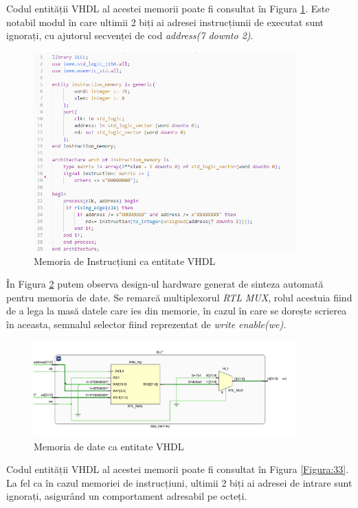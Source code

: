 \documentclass[12pt]{article}
\begin{document}
 Codul entității VHDL al acestei memorii poate fi consultat în Figura \ref{Figura:31}. Este notabil modul în care ultimii 2 biți ai adresei instrucțiunii de executat sunt ignorați, cu ajutorul secvenței de cod \textit{address(7 downto 2)}.
 
\newpage
\begin{figure}[h!]
 \includegraphics[width=0.9\textwidth]{instmemcode.png}
 \centering
 \caption{Memoria de Instrucțiuni ca entitate VHDL}
 \label{Figura:31}
 \end{figure}
 

În Figura \ref{Figura:32} putem observa design-ul hardware generat de sinteza automată pentru memoria de date. Se remarcă multiplexorul \textit{RTL} \textit{MUX}, rolul acestuia fiind de a lega la masă datele care ies din memorie, în cazul în care se dorește scrierea în aceasta, semnalul selector fiind reprezentat de \textit{write enable(we)}.
 
\begin{figure}[h!]
 \includegraphics[width=0.9\textwidth]{datamem.png}
 \centering
 \caption{Memoria de date ca entitate VHDL}
 \label{Figura:32}
 \end{figure}
  
 Codul entității VHDL al acestei memorii poate fi consultat în Figura \ref{Figura:33}. La fel ca în cazul memoriei de instrucțiuni, ultimii 2 biți ai adresei de intrare sunt ignorați, asigurând un comportament adresabil pe octeți.
 
\end{document}
